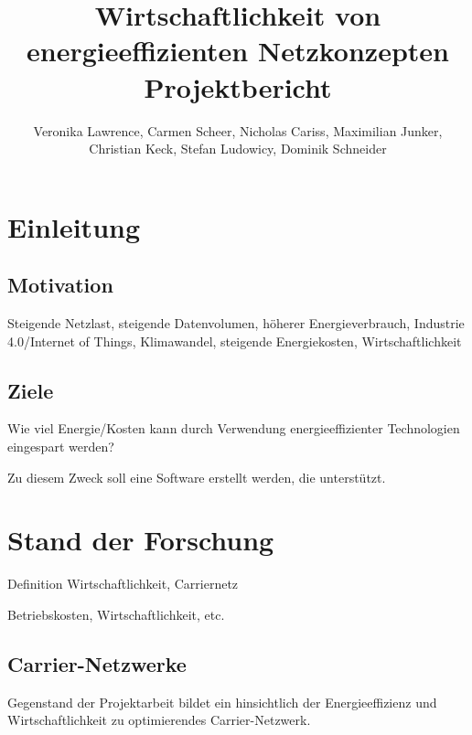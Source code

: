 \documentclass[12pt,titlepage]{article}
\newcommand{\firstpages}{

     \newpage
     \tableofcontents{}
     \addtocontents{toc}{~\hfill\textbf{Seite}\par}

     \newpage
     \listoffigures

     \newpage
     \listoftables
     \newpage
}
\begin{document}
\title{\huge{Wirtschaftlichkeit von energieeffizienten Netzkonzepten} \\ \large{Projektbericht}} 
\author{Veronika Lawrence, Carmen Scheer, Nicholas Cariss, Maximilian Junker,\\ Christian Keck, Stefan Ludowicy, Dominik Schneider} 
\maketitle
\firstpages

\section{Einleitung}

\subsection{Motivation}
Steigende Netzlast, steigende Datenvolumen, höherer Energieverbrauch, Industrie 4.0/Internet of Things, Klimawandel, steigende Energiekosten, Wirtschaftlichkeit

\subsection{Ziele}
Wie viel Energie/Kosten kann durch Verwendung energieeffizienter Technologien eingespart werden? 

Zu diesem Zweck soll eine Software erstellt werden, die unterstützt.


\section{Stand der Forschung}
Definition Wirtschaftlichkeit, Carriernetz

Betriebskosten, Wirtschaftlichkeit, etc.


\subsection{Carrier-Netzwerke}

%

Gegenstand der Projektarbeit bildet ein hinsichtlich der Energieeffizienz und Wirtschaftlichkeit zu optimierendes Carrier-Netzwerk.
\end{document}
